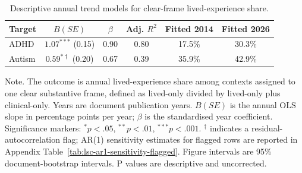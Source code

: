 \begin{table}[htbp]
\centering
\caption{Descriptive annual trend models for clear-frame lived-experience share.}
\label{tab:lsc-classification-frame-time-trends}
\small
\begin{tabular}{@{}lccccc@{}}
\toprule
Target & $B(SE)$ & $\beta$ & Adj. $R^2$ & Fitted 2014 & Fitted 2026 \\
\midrule
ADHD & $1.07^{***}$ (0.15) & 0.90 & 0.80 & 17.5\% & 30.3\% \\
Autism & $0.59^{*\dagger}$ (0.20) & 0.67 & 0.39 & 35.9\% & 42.9\% \\
\bottomrule
\end{tabular}
\parbox{\linewidth}{\footnotesize Note. The outcome is annual lived-experience share among contexts assigned to one clear substantive frame, defined as lived-only divided by lived-only plus clinical-only. Years are document publication years. $B(SE)$ is the annual OLS slope in percentage points per year; $\beta$ is the standardised year coefficient. Significance markers: $^{*}p<.05$, $^{**}p<.01$, $^{***}p<.001$. $^{\dagger}$ indicates a residual-autocorrelation flag; AR(1) sensitivity estimates for flagged rows are reported in Appendix Table~\ref{tab:lsc-ar1-sensitivity-flagged}. Figure intervals are 95\% document-bootstrap intervals. P values are descriptive and uncorrected.}
\end{table}
